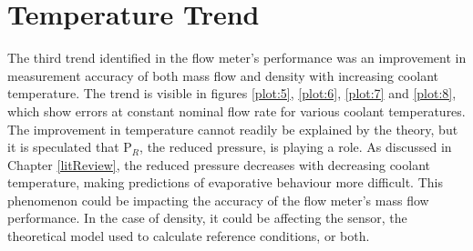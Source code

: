 \documentclass{report}
\begin{document}
\section{Temperature Trend}
The third trend identified in the flow meter's performance was an improvement in measurement accuracy of both mass flow and density with increasing coolant temperature. The trend is visible in figures \ref{plot:5}, \ref{plot:6}, \ref{plot:7} and \ref{plot:8}, which show errors at constant nominal flow rate for various coolant temperatures. \\
The improvement in temperature cannot readily be explained by the theory, but it is speculated that P$_R$, the reduced pressure, is playing a role. As discussed in Chapter \ref{litReview}, the reduced pressure decreases with decreasing coolant temperature, making predictions of evaporative behaviour more difficult. This phenomenon could be impacting the accuracy of the flow meter's mass flow performance. In the case of density, it could be affecting the sensor, the theoretical model used to calculate reference conditions, or both.
\end{document}
